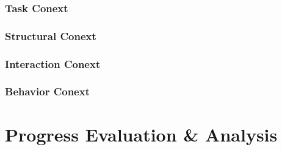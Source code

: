 \documentclass[conference]{IEEEtran}
\begin{document}
\subsubsection{\textbf{Task Conext }}


\subsubsection{\textbf{Structural Conext }}


\subsubsection{\textbf{Interaction Conext }}


\subsubsection{\textbf{Behavior Conext }}



\section{\textbf{Progress Evaluation \& Analysis }}
\end{document}
